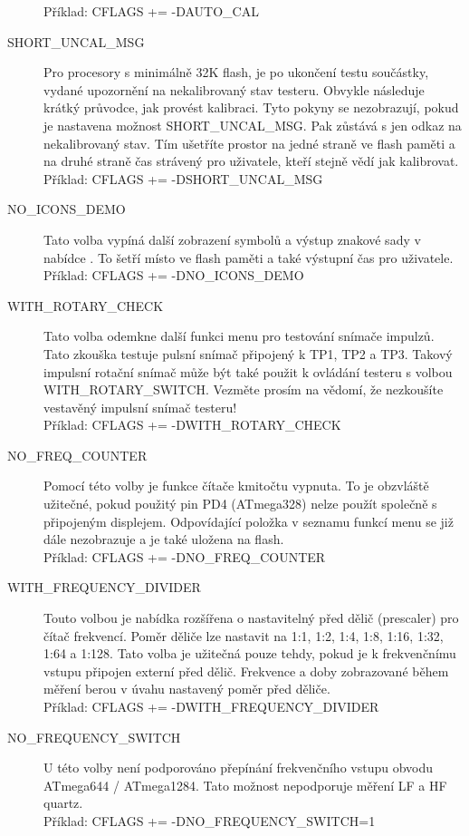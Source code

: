 \begin{description}
Příklad: CFLAGS += -DAUTO\_CAL
  \item[SHORT\_UNCAL\_MSG] Pro procesory s minimálně 32K flash, je po ukončení testu součástky, vydané
upozornění na nekalibrovaný stav testeru.
Obvykle následuje krátký průvodce, jak provést kalibraci.
Tyto pokyny se nezobrazují, pokud je nastavena možnost SHORT\_UNCAL\_MSG.
Pak zůstává s jen odkaz na nekalibrovaný stav.
Tím ušetříte prostor na jedné straně ve flash paměti a na druhé straně čas strávený pro uživatele,
kteří stejně vědí jak kalibrovat.\\
Příklad: CFLAGS += -DSHORT\_UNCAL\_MSG
 \item[NO\_ICONS\_DEMO]
Tato volba vypíná další zobrazení symbolů a výstup znakové sady v nabídce
.
To šetří místo ve flash paměti a také výstupní čas pro uživatele.\\
Příklad: CFLAGS += -DNO\_ICONS\_DEMO
 \item[WITH\_ROTARY\_CHECK]
Tato volba odemkne další funkci menu pro testování snímače impulzů.
Tato zkouška testuje pulsní snímač připojený k TP1, TP2 a TP3.
Takový impulsní rotační snímač může být také použit k ovládání testeru s volbou WITH\_ROTARY\_SWITCH.
Vezměte prosím na vědomí, že nezkoušíte vestavěný impulsní snímač testeru!\\
Příklad: CFLAGS += -DWITH\_ROTARY\_CHECK
 \item[NO\_FREQ\_COUNTER]
Pomocí této volby je funkce čítače kmitočtu vypnuta.
To je obzvláště užitečné, pokud použitý pin PD4 (ATmega328) nelze použít společně s
připojeným displejem.
Odpovídající položka v seznamu funkcí menu se již dále nezobrazuje a je také uložena na flash.\\
Příklad: CFLAGS += -DNO\_FREQ\_COUNTER
 \item[WITH\_FREQUENCY\_DIVIDER]
Touto volbou je nabídka rozšířena o nastavitelný před dělič (prescaler) pro čítač frekvencí.
Poměr děliče lze nastavit na 1:1, 1:2, 1:4, 1:8, 1:16, 1:32, 1:64 a 1:128.
Tato volba je užitečná pouze tehdy, pokud je k frekvenčnímu vstupu připojen externí před dělič.
Frekvence a doby zobrazované během měření berou v úvahu nastavený poměr před děliče.\\
Příklad: CFLAGS += -DWITH\_FREQUENCY\_DIVIDER


 \item[NO\_FREQUENCY\_SWITCH]
U této volby není podporováno přepínání frekvenčního vstupu obvodu ATmega644 / ATmega1284. 
Tato možnost nepodporuje měření LF a HF quartz.\\
Příklad: CFLAGS += -DNO\_FREQUENCY\_SWITCH=1


\end{description}
